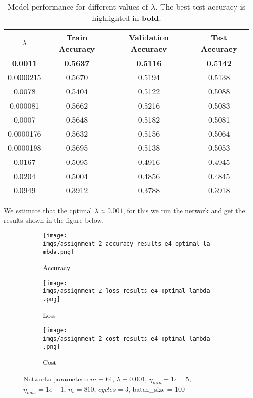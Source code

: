 \documentclass{article}
\begin{document}
\begin{table}[h!]
    \centering
    \begin{tabular}{|c|c|c|c|}
    \hline
    \textbf{$\lambda$} & \textbf{Train Accuracy} & \textbf{Validation Accuracy} & \textbf{Test Accuracy} \\
    \hline
    \textbf{0.0011} & \textbf{0.5637} & \textbf{0.5116} & \textbf{0.5142} \\
    0.0000215 & 0.5670 & 0.5194 & 0.5138 \\
    0.0078 & 0.5404 & 0.5122 & 0.5088 \\
    0.000081 & 0.5662 & 0.5216 & 0.5083 \\
    0.0007 & 0.5648 & 0.5182 & 0.5081 \\
    0.0000176 & 0.5632 & 0.5156 & 0.5064 \\
    0.0000198 & 0.5695 & 0.5138 & 0.5053 \\
    0.0167 & 0.5095 & 0.4916 & 0.4945 \\
    0.0204 & 0.5004 & 0.4856 & 0.4845 \\
    0.0949 & 0.3912 & 0.3788 & 0.3918 \\
    \hline
    \end{tabular}
    \caption{Model performance for different values of $\lambda$. The best test accuracy is highlighted in \textbf{bold}.}
    \label{tab:experiment2}
\end{table}

We estimate that the optimal $\lambda \approx 0.001$, for this we run the network and get the results shown in the figure below.

\begin{figure}[h!]
    \centering
    \begin{subfigure}[b]{0.45\textwidth}
        \centering
        \texttt{[image: imgs/assignment\_2\_accuracy\_results\_e4\_optimal\_lambda.png]}
        \caption{Accuracy}
    \end{subfigure}
    \begin{subfigure}[b]{0.45\textwidth}
        \centering
        \texttt{[image: imgs/assignment\_2\_loss\_results\_e4\_optimal\_lambda.png]}
        \caption{Loss}
    \end{subfigure}
    \begin{subfigure}[b]{0.45\textwidth}
        \centering
        \texttt{[image: imgs/assignment\_2\_cost\_results\_e4\_optimal\_lambda.png]}
        \caption{Cost}
    \end{subfigure}
    \caption{Networks parameters: $m = 64$, $\lambda = 0.001$, $\eta_{min} = 1e-5$, $\eta_{max} = 1e-1$, $n_s = 800$, $cycles = 3$, batch\_size = 100}
    \label{fig:experiment2_optimal_lambda}
\end{figure}
\end{document}
